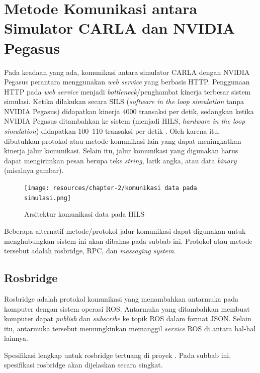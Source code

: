 \section{Metode Komunikasi antara Simulator CARLA dan NVIDIA Pegasus}

Pada keadaan yang ada, komunikasi antara simulator CARLA dengan NVIDIA Pegasus
perantara menggunakan \textit{web service} yang berbasis HTTP. Penggunaan HTTP
pada \textit{web service} menjadi \textit{bottleneck}/penghambat kinerja
terbesar sistem simulasi. Ketika dilakukan secara SILS (\textit{software in the
      loop simulation} tanpa NVIDIA Pegasus) didapatkan kinerja 4000 transaksi per
detik, sedangkan ketika NVIDIA Pegasus ditambahkan ke sistem (menjadi HILS,
\textit{hardware in the loop simulation}) didapatkan 100--110 transaksi per
detik \parencite{trilaksono_laporanRispro}. Oleh karena itu, dibutuhkan protokol
atau metode komunikasi lain yang dapat meningkatkan kinerja jalur komunikasi.
Selain itu, jalur komunikasi yang digunakan harus dapat mengirimkan pesan berupa
teks \textit{string}, larik angka, atau data \textit{binary} (misalnya gambar).

\begin{figure}
      \begin{center}
            \texttt{[image: resources/chapter-2/komunikasi
                  data pada simulasi.png]}
            \caption{Arsitektur komunikasi data pada HILS \parencite{trilaksono_laporanRispro}}
      \end{center}
\end{figure}

Beberapa alternatif metode/protokol jalur komunikasi dapat digunakan untuk menghubungkan
sistem ini akan dibahas pada subbab ini. Protokol atau metode tersebut adalah rosbridge,
RPC, dan \textit{messaging system}.

\subsection{Rosbridge}

Rosbridge adalah protokol komunikasi yang menambahkan antarmuka pada komputer
dengan sistem operasi ROS. Antarmuka yang ditambahkan membuat komputer dapat
\textit{publish} dan \textit{subscribe} ke topik ROS dalam format JSON. Selain
itu, antarmuka tersebut memungkinkan memanggil \textit{service} ROS di antara
hal-hal lainnya.

Spesifikasi lengkap untuk rosbridge tertuang di proyek \parencite{ros_bridge}.
Pada subbab ini, spesifikasi rosbridge akan dijelaskan secara singkat.

